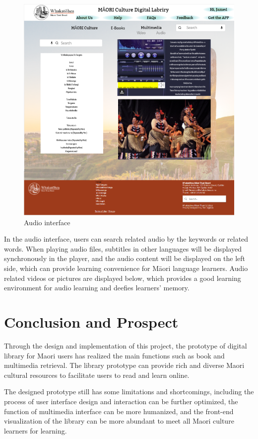 \begin{figure}[htbp]
  \centerline{\includegraphics[width=400pt]{images/3-3-2.png}}
  \caption{Audio interface}
  \label{fig30}
\end{figure}

In the audio interface, users can search related audio by the keywords or related words. When playing audio files, subtitles in other languages will be displayed synchronously in the player, and the audio content will be displayed on the left side, which can provide learning convenience for Māori language learners. Audio related videos or pictures are displayed below, which provides a good learning environment for audio learning and deefies learners' memory.

\section{Conclusion and Prospect}

Through the design and implementation of this project, the prototype of digital library for Maori users has realized the main functions such as book and multimedia retrieval. The library prototype can provide rich and diverse Maori cultural resources to facilitate users to read and learn online.

The designed prototype still has some limitations and shortcomings, including the process of user interface design and interaction can be further optimized, the function of multimedia interface can be more humanized, and the front-end visualization of the library can be more abundant to meet all Maori culture learners for learning.

